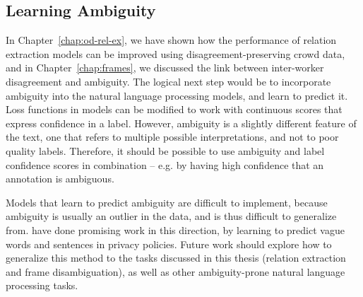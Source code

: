 \subsection{Learning Ambiguity}

In Chapter~\ref{chap:od-rel-ex}, we have shown how the performance of relation extraction models can be improved using disagreement-preserving crowd data, and in Chapter~\ref{chap:frames}, we discussed the link between inter-worker disagreement and ambiguity. The logical next step would be to incorporate ambiguity into the natural language processing models, and learn to predict it. 
Loss functions in models can be modified to work with continuous scores that express confidence in a label. However, ambiguity is a slightly different feature of the text, one that refers to multiple possible interpretations, and not to poor quality labels. Therefore, it should be possible to use ambiguity and label confidence scores in combination -- e.g. by having high confidence that an annotation is ambiguous.

Models that learn to predict ambiguity are difficult to implement, because ambiguity is usually an outlier in the data, and is thus difficult to generalize from. \citet{lebanoff2018automatic} have done promising work in this direction, by learning to predict vague words and sentences in privacy policies. Future work should explore how to generalize this method to the tasks discussed in this thesis (relation extraction and frame disambiguation), as well as other ambiguity-prone natural language processing tasks.
